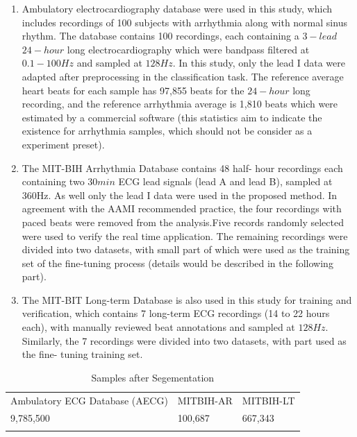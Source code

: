 \documentclass[graybox]{svmult}
\begin{document}
\begin{enumerate}
\item Ambulatory electrocardiography database were used in this study, which includes recordings of 100 subjects with arrhythmia along with normal sinus rhythm. The database contains 100 recordings, each containing a $3-lead$ $24-hour$ long electrocardiography which were bandpass filtered at $0.1-100Hz$ and sampled at $128Hz$. In this study, only the lead I data were adapted after preprocessing in the classification task. The reference average heart beats for each sample has 97,855 beats for the $24-hour$ long recording, and the reference arrhythmia average is 1,810 beats which were estimated by a commercial software (this statistics aim to indicate the existence for arrhythmia samples, which should not be consider as a experiment preset).

\item The MIT-BIH Arrhythmia Database \citep{PhysioNet} contains 48 half- hour recordings each containing two $30min$ ECG lead signals (lead A and lead B), sampled at 360Hz. As well only the lead I data were used in the proposed method. In agreement with the AAMI recommended practice, the four recordings with paced beats were removed from the analysis.Five records randomly selected were used to verify the real time application. The remaining recordings were divided into two datasets, with small part of which were used as the training set of the fine-tuning process (details would be described in the following part).

\item The MIT-BIT Long-term Database is also used in this study for training and verification, which contains 7 long-term ECG recordings (14 to 22 hours each), with manually reviewed beat annotations and sampled at $128Hz$. Similarly, the 7 recordings were divided into two datasets, with part used as the fine- tuning training set. 

\end{enumerate}


\begin{table}
\caption{Samples after Segementation}
\label{tab:1}       %
%
%
\begin{tabular}{p{5cm}p{3.2cm}p{3.1cm}}
\hline\noalign{\smallskip}
Ambulatory ECG Database (AECG) & MITBIH-AR & MITBIH-LT   \\
\noalign{\smallskip}\svhline\noalign{\smallskip}
9,785,500 & 100,687  & 667,343 \\
\noalign{\smallskip}\hline\noalign{\smallskip}
\end{tabular}
\end{table}
\end{document}
